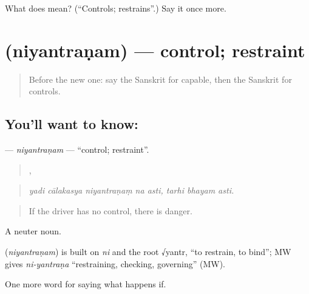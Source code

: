 \begin{tcolorbox}[breakable,colback=teal!4,colframe=teal!35!black,title={Before you move on}]
What does  mean? (\textquotedblleft{}Controls; restrains\textquotedblright{}.) Say it once more.
\end{tcolorbox}
\section[\texorpdfstring{\sk{नियन्त्रणम्} (niyantraṇam)}{नियन्त्रणम् (niyantraṇam)}]{ (niyantraṇam) — control; restraint}

\label{lesson:SA-C376-niyantranam}



\begin{quote}
Before the new one: say the Sanskrit for capable, then the Sanskrit for controls.
\end{quote}

\subsection*{You'll want to know: }
\textbf{} — \emph{niyantraṇam} — \textquotedblleft{}control; restraint\textquotedblright{}.

\begin{quote}
    ,   
\end{quote}

\begin{quote}
\emph{yadi cālakasya niyantraṇaṃ na asti, tarhi bhayam asti.}
\end{quote}

\begin{quote}
If the driver has no control, there is danger.
\end{quote}

A neuter noun.

\begin{cousinweb}
\textbf{} (\emph{niyantraṇam}) is built on \emph{ni} and the root √yantr, \textquotedblleft{}to restrain, to bind\textquotedblright{}; MW gives \emph{ni-yantraṇa} \textquotedblleft{}restraining, checking, governing\textquotedblright{} (MW).
\end{cousinweb}

\begin{grammarlens}[title={What you've built}]
One more word for saying what happens if.
\end{grammarlens}

